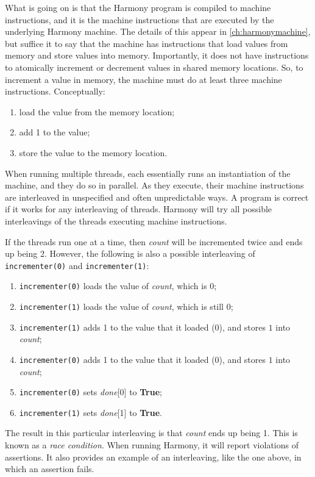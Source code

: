 \documentclass{report}
\begin{document}
What is going on is that the Harmony program is compiled to machine instructions,
%
and it is the machine instructions that are executed by the underlying Harmony
machine.  The details of this appear in \autoref{ch:harmonymachine},
but suffice it to
say that the machine has instructions that load values from memory and store
values into memory.  Importantly, it does not have instructions to atomically
increment or decrement values in shared memory locations.
So, to increment a value in memory,
the machine must do at least three machine instructions.  Conceptually:
\begin{enumerate}
\item load the value from the memory location;
\item add 1 to the value;
\item store the value to the memory location.
\end{enumerate}

When running multiple threads, each essentially runs an instantiation of
the machine, and they do so in parallel.  As they execute, their machine
instructions are interleaved
%
in unspecified and often unpredictable ways.
A program is correct if it works for any interleaving of threads.
Harmony will try all possible interleavings of the threads
executing machine instructions.

If the threads run one at a time, then \textit{count} will be incremented
twice and ends up being 2.  However, the following is also
a possible interleaving of \texttt{incrementer(0)} and \texttt{incrementer(1)}:
\begin{enumerate}
\item \texttt{incrementer(0)} loads the value of \textit{count}, which is 0;
\item \texttt{incrementer(1)} loads the value of \textit{count}, which is still 0;
\item \texttt{incrementer(1)} adds 1 to the value that it loaded (0), and
stores $1$ into \textit{count};
\item \texttt{incrementer(0)} adds 1 to the value that it loaded (0), and
stores $1$ into \textit{count};
\item \texttt{incrementer(0)} sets \textit{done}[0] to \textbf{True};
\item \texttt{incrementer(1)} sets \textit{done}[1] to \textbf{True}.
\end{enumerate}

The result in this particular interleaving is that \textit{count} ends up
being 1.
This is known as a \emph{race condition}.
%
When running Harmony, it will
report violations of assertions.  It also provides an example
of an interleaving, like the one above, in which an assertion fails.
\end{document}
